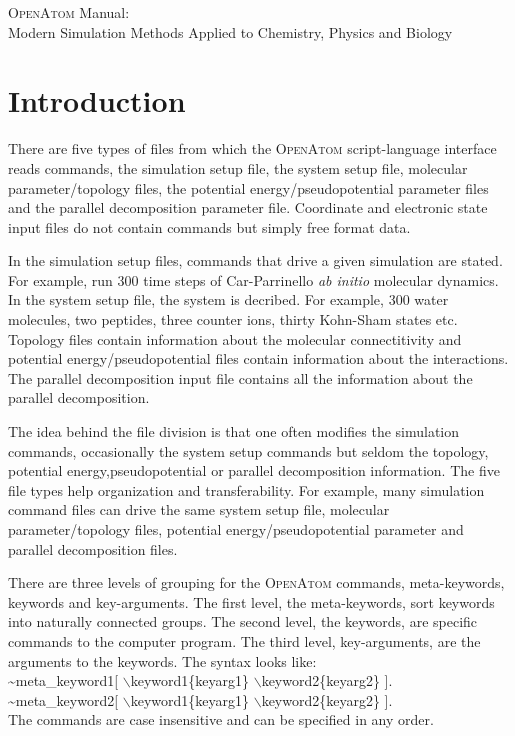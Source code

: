 \documentclass[12pt]{article}
\begin{document}

\leavevmode\vfill
\begin{center}
\huge
\textsc{OpenAtom} Manual: \\
$\ $ \\
\Large
Modern Simulation Methods Applied to Chemistry, Physics and Biology
\end{center}
\vfill

\newpage
\section*{\bf Introduction}

There are five types of files from which the \textsc{OpenAtom}
script-language interface reads commands, the
simulation setup file, the system setup file, molecular parameter/topology
files, the potential energy/pseudopotential parameter files and the
parallel decomposition parameter file. Coordinate and electronic state input files do 
not contain commands but simply free format data. 

In the simulation setup files, commands that drive a given simulation
are stated. For example, run 300 time steps of Car-Parrinello {\em ab initio}
molecular dynamics. In the system setup file, the 
system is decribed. For example, 300 water molecules, two peptides,
three counter ions, thirty Kohn-Sham states etc.  Topology files
contain information about the molecular connectitivity and potential
energy/pseudopotential files contain information about the
interactions. The parallel decomposition
input file contains all the information about the parallel decomposition.

The idea behind the file division is that one often modifies the
simulation commands, occasionally the system setup commands but seldom the 
topology, potential energy,pseudopotential or parallel decomposition
information. 
The five file types help organization and transferability. For
example, many simulation command files can drive the same system setup file, 
molecular parameter/topology files, potential energy/pseudopotential
parameter and parallel decomposition files.

There are three levels of grouping for the \textsc{OpenAtom} commands, 
meta-keywords, keywords and key-arguments.
The first level, the meta-keywords, sort keywords into naturally
connected groups. The second level, the keywords, are specific
commands to the computer program. The third level, key-arguments,
are the arguments to the keywords.  The syntax looks like: \\ 
\hspace*{0.5in} \~{}meta\_keyword1[ $\backslash$keyword1\{keyarg1\}
$\backslash$keyword2\{keyarg2\} ]. \\
\hspace*{0.5in} \~{}meta\_keyword2[ $\backslash$keyword1\{keyarg1\}
$\backslash$keyword2\{keyarg2\} ]. \\
The commands are case insensitive and can be specified in any order.
\end{document}
